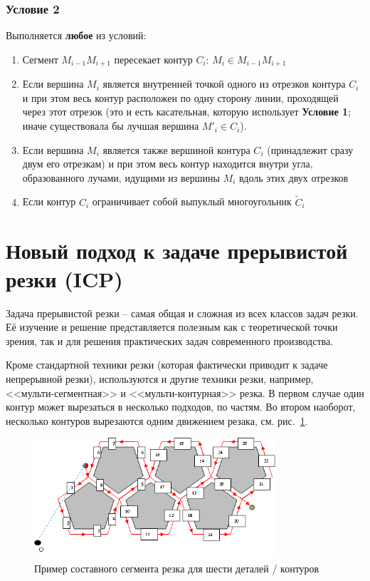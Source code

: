 \documentclass[10pt]{SPIIRAS_Proceedings}
\begin{document}
\subsubsection*{Условие 2}
  Выполняется \textbf{любое} из условий:
  \begin{enumerate}
    \item
    Сегмент
    $M_{i-1} M_{i+1}$
    пересекает контур
    $C_i$:
    $M_i \in M_{i-1} M_{i+1}$
    \item
    Если вершина
    $M_i$
    является внутренней точкой одного из
    отрезков контура
    $C_i$
    и при этом весь контур расположен
    по одну сторону линии,
    проходящей через этот отрезок
    (это и есть касательная,
    которую использует {\bf Условие 1};
    иначе существовала бы лучшая вершина
    $M'_i\in C_i$).
    \item
    Если вершина
    $M_i$
    является также вершиной контура
    $C_i$
    (принадлежит сразу двум его отрезкам)
    и при этом весь контур находится
    внутри угла,
    образованного лучами,
    идущими из вершины
    $M_i$
    вдоль этих двух отрезков
    \item
    Если контур
    $C_i$
    ограничивает собой выпуклый
    многоугольник
    $\tilde C_i$
  \end{enumerate}

\section{Новый подход к задаче прерывистой резки (ICP)}

Задача прерывистой резки -- самая общая и сложная
из всех классов задач резки.
Её изучение и решение представляется
полезным как с теоретической точки зрения,
так и для решения практических задач
современного производства.

Кроме стандартной техники резки
(которая фактически приводит к задаче непрерывной резки),
используются и другие техники резки,
например,
<<мульти-сегментная>>
и
<<мульти-контурная>> резка.
В первом случае один контур
может вырезаться в несколько подходов,
по частям.
Во втором наоборот,
несколько контуров вырезаются
одним движением резака,
см. рис.~\ref{fig:6x5}.

\begin{figure}
  \centering
  \includegraphics[width=0.8\textwidth]{pentagons.png}
  \caption{Пример составного сегмента резка для шести деталей / контуров}
  \label{fig:6x5}
\end{figure}
\end{document}
